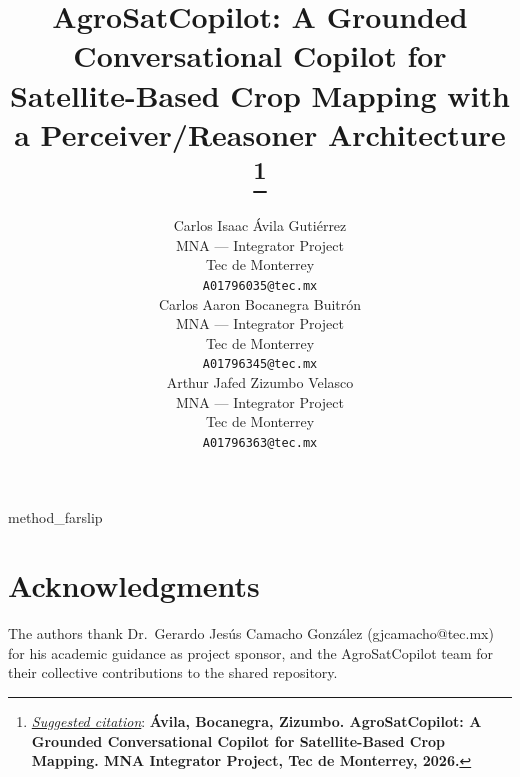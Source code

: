 \documentclass{article}
\title{AgroSatCopilot: A Grounded Conversational Copilot for
Satellite-Based Crop Mapping with a Perceiver/Reasoner Architecture
\thanks{\textit{\underline{Suggested citation}}: \textbf{\'Avila,
Bocanegra, Zizumbo. AgroSatCopilot: A Grounded Conversational Copilot
for Satellite-Based Crop Mapping. MNA Integrator Project, Tec de
Monterrey, 2026.}}
}
\author{
  Carlos Isaac \'Avila Guti\'errez \\
  MNA --- Integrator Project \\
  Tec de Monterrey \\
  \texttt{A01796035@tec.mx} \\
  \And
  Carlos Aaron Bocanegra Buitr\'on \\
  MNA --- Integrator Project \\
  Tec de Monterrey \\
  \texttt{A01796345@tec.mx} \\
  \And
  Arthur Jafed Zizumbo Velasco \\
  MNA --- Integrator Project \\
  Tec de Monterrey \\
  \texttt{A01796363@tec.mx} \\
}
\begin{document}
\maketitle








{method_farslip}


\label{sec:farslip_transfer}




\section*{Acknowledgments}
The authors thank Dr.\ Gerardo Jes\'us Camacho Gonz\'alez
(gjcamacho@tec.mx) for his academic guidance as project sponsor, and the
AgroSatCopilot team for their collective contributions to the shared
repository.





\end{document}
